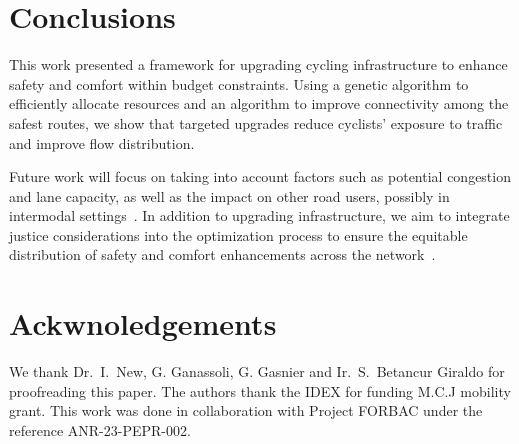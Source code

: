 \documentclass[letterpaper, 10 pt, conference]{ieeeconf}  %
\begin{document}





\section{Conclusions}
\label{conclusions}

This work presented a framework for upgrading cycling infrastructure to enhance safety and comfort within budget constraints. Using a genetic algorithm to efficiently allocate resources and an algorithm to improve connectivity among the safest routes, we show that targeted upgrades reduce cyclists' exposure to traffic and improve flow distribution. 

Future work will focus on taking into account factors such as potential congestion and lane capacity, as well as the impact on other road users, possibly in intermodal settings~\cite{wollenstein2021routing}. In addition to upgrading infrastructure, we aim to integrate justice considerations into the optimization process to ensure the equitable distribution of safety and comfort enhancements across the network~\cite{salazar2024accessibility}.

\section*{Ackwnoledgements}
We thank Dr.\ I.\ New, G. Ganassoli, G. Gasnier and Ir.\ S.\ Betancur Giraldo for proofreading this paper. The authors thank the IDEX for funding M.C.J  mobility  grant. This work was done in collaboration with Project FORBAC under the reference ANR-23-PEPR-002.
\end{document}
